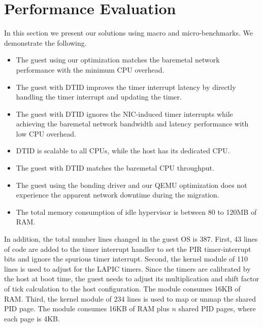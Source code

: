 \section{Performance Evaluation}
In this section we present our solutions using macro
and micro-benchmarks. We demonstrate the following.
\begin{itemize}
  \item The guest using our optimization matches the baremetal
  network performance with the minimum CPU overhead.
  \item The guest with DTID improves the timer interrupt
  latency by directly handling the timer interrupt and
  updating the timer.
  \item The guest with DTID ignores the NIC-induced timer
  interrupts while achieving the baremetal network bandwidth
  and latency performance with low CPU overhead.
  \item DTID is scalable to all CPUs, while the host has its
  dedicated CPU.
  \item The guest with DTID matches the baremetal CPU
  throughput.
  \item The guest using the bonding driver and our QEMU
  optimization does not experience the apparent network
  downtime during the migration.
  \item The total memory consumption of idle hypervisor is
  between 80 to 120MB of RAM.
\end{itemize}

In addition, the total number lines changed in the guest OS is
387. First, 43 lines of code are added to the timer interrupt
handler to set the PIR timer-interrupt bits and ignore the
spurious timer interrupt. Second, the kernel module of 110
lines is used to adjust for the LAPIC timers. Since the timers
are calibrated by the host at boot time, the guest needs to
adjust its multiplication and shift factor of tick calculation
to the host configuration. The module consumes 16KB of RAM.
Third, the kernel module of 234 lines is used to map or unmap
the shared PID page. The module consumes 16KB of RAM plus $n$
shared PID pages, where each page is 4KB.

